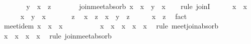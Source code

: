 \begin{isabellebody}
\ \ \ \ \isamarkupfalse%
\ \isamarkupfalse%
\ {\isachardoublequoteopen}y\ {\isasymsqunion}\ x\ {\isasymsqsubseteq}\ z{\isachardoublequoteclose}\ \isacommand{{\isachardot}{\isachardot}}\isamarkupfalse%
\isanewline
\ \ \isamarkupfalse%
\isanewline
\isanewline
\ \ \isamarkupfalse%
\ join{\isacharunderscore}meet{\isacharunderscore}absorb{\isacharcolon}\ {\isachardoublequoteopen}x\ {\isasymsqunion}\ {\isacharparenleft}x\ {\isasymsqinter}\ y{\isacharparenright}\ {\isacharequal}\ x{\isachardoublequoteclose}\isanewline
\ \ \isamarkupfalse%
\ {\isacharparenleft}rule\ joinI{\isacharparenright}\isanewline
\ \ \ \ \isamarkupfalse%
\ {\isachardoublequoteopen}x\ {\isasymsqsubseteq}\ x{\isachardoublequoteclose}\ \isacommand{{\isachardot}{\isachardot}}\isamarkupfalse%
\isanewline
\ \ \ \ \isamarkupfalse%
\ {\isachardoublequoteopen}x\ {\isasymsqinter}\ y\ {\isasymsqsubseteq}\ x{\isachardoublequoteclose}\ \isacommand{{\isachardot}{\isachardot}}\isamarkupfalse%
\isanewline
\ \ \ \ \isamarkupfalse%
\ z\ \isamarkupfalse%
\ {\isachardoublequoteopen}x\ {\isasymsqsubseteq}\ z{\isachardoublequoteclose}\ \ {\isachardoublequoteopen}x\ {\isasymsqinter}\ y\ {\isasymsqsubseteq}\ z{\isachardoublequoteclose}\isanewline
\ \ \ \ \isamarkupfalse%
\ {\isachardoublequoteopen}x\ {\isasymsqsubseteq}\ z{\isachardoublequoteclose}\ \isamarkupfalse%
\ fact\isanewline
\ \ \isamarkupfalse%
\isanewline
\isanewline
\ \ \isamarkupfalse%
\ meet{\isacharunderscore}idem{\isacharcolon}\ {\isachardoublequoteopen}x\ {\isasymsqinter}\ x\ {\isacharequal}\ x{\isachardoublequoteclose}\isanewline
\ \ \isamarkupfalse%
\ {\isacharminus}\isanewline
\ \ \ \ \isamarkupfalse%
\ {\isachardoublequoteopen}x\ {\isasymsqinter}\ {\isacharparenleft}x\ {\isasymsqunion}\ {\isacharparenleft}x\ {\isasymsqinter}\ x{\isacharparenright}{\isacharparenright}\ {\isacharequal}\ x{\isachardoublequoteclose}\ \isamarkupfalse%
\ {\isacharparenleft}rule\ meet{\isacharunderscore}join{\isacharunderscore}absorb{\isacharparenright}\isanewline
\ \ \ \ \isamarkupfalse%
\ \isamarkupfalse%
\ {\isachardoublequoteopen}x\ {\isasymsqunion}\ {\isacharparenleft}x\ {\isasymsqinter}\ x{\isacharparenright}\ {\isacharequal}\ x{\isachardoublequoteclose}\ \isamarkupfalse%
\ {\isacharparenleft}rule\ join{\isacharunderscore}meet{\isacharunderscore}absorb{\isacharparenright}\isanewline

\end{isabellebody}

